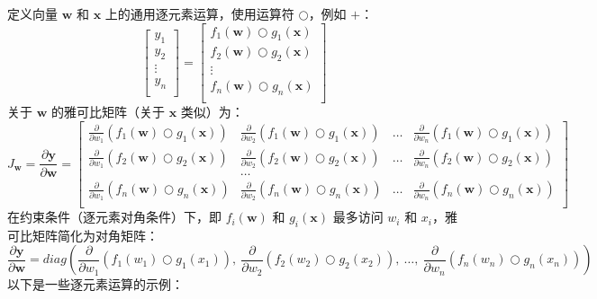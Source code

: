 \documentclass[11pt]{article}
\begin{document}
定义向量 $\mathbf{w}$ 和 $\mathbf{x}$ 上的通用逐元素运算，使用运算符 $\bigcirc$，例如 $+$：
\[
\begin{bmatrix}
           y_1\\
           y_2\\
           \vdots \\
           y_n\\
           \end{bmatrix} = \begin{bmatrix}
           f_{1}(\mathbf{w}) \bigcirc g_{1}(\mathbf{x})\\
           f_{2}(\mathbf{w}) \bigcirc g_{2}(\mathbf{x})\\
           \vdots \\
           f_{n}(\mathbf{w}) \bigcirc g_{n}(\mathbf{x})\\
         \end{bmatrix}
\]
关于 $\mathbf{w}$ 的雅可比矩阵（关于 $\mathbf{x}$ 类似）为：
\[ J_\mathbf{w} = 
\frac{\partial \mathbf{y}}{\partial \mathbf{w}}  = \begin{bmatrix}
\frac{\partial}{\partial w_1} ( f_{1}(\mathbf{w}) \bigcirc g_{1}(\mathbf{x}) ) & \frac{\partial}{\partial w_2} ( f_{1}(\mathbf{w}) \bigcirc g_{1}(\mathbf{x}) ) & \ldots & \frac{\partial}{\partial w_n} ( f_{1}(\mathbf{w}) \bigcirc g_{1}(\mathbf{x}) )\\
\frac{\partial}{\partial w_1} ( f_{2}(\mathbf{w}) \bigcirc g_{2}(\mathbf{x}) ) & \frac{\partial}{\partial w_2} ( f_{2}(\mathbf{w}) \bigcirc g_{2}(\mathbf{x}) ) & \ldots & \frac{\partial}{\partial w_n} ( f_{2}(\mathbf{w}) \bigcirc g_{2}(\mathbf{x}) )\\
& \ldots\\
\frac{\partial}{\partial w_1} ( f_{n}(\mathbf{w}) \bigcirc g_{n}(\mathbf{x}) ) & \frac{\partial}{\partial w_2} ( f_{n}(\mathbf{w}) \bigcirc g_{n}(\mathbf{x}) ) & \ldots & \frac{\partial}{\partial w_n} ( f_{n}(\mathbf{w}) \bigcirc g_{n}(\mathbf{x}) )\\
\end{bmatrix} 
\]
在约束条件（逐元素对角条件）下，即 $f_i(\mathbf{w})$ 和 $g_i(\mathbf{x})$ 最多访问 $w_i$ 和 $x_i$，雅可比矩阵简化为对角矩阵：
\[
\frac{\partial \mathbf{y}}{\partial \mathbf{w}} = diag \left( \frac{\partial}{\partial w_1}(f_{1}(w_1) \bigcirc g_{1}(x_1)),~ \frac{\partial}{\partial w_2}(f_{2}(w_2) \bigcirc g_{2}(x_2)),~ \ldots,~ \frac{\partial}{\partial w_n}(f_{n}(w_n) \bigcirc g_{n}(x_n)) \right)
\]
以下是一些逐元素运算的示例：
\end{document}
